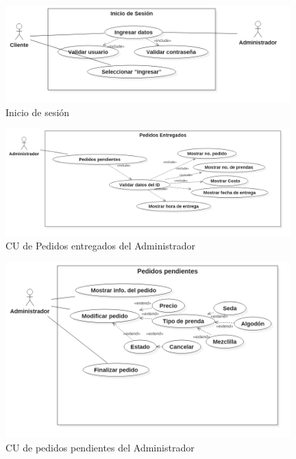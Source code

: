\begin{figure}[htb]
\begin{center}
\includegraphics[width=11cm]{./imagenes/diagramas/CU_IniciarSesion.png}
\end{center}
\caption{Inicio de sesión}
\end{figure}


\begin{figure}[htb]
\begin{center}
\includegraphics[width=11cm]{./imagenes/diagramas/CU_PedidosEntregados(Admin).png}
\end{center}
\caption{CU de Pedidos entregados del Administrador}
\end{figure}


\begin{figure}[htb]
\begin{center}
\includegraphics[width=11cm]{./imagenes/diagramas/CU_PedidosPendientes(Admin).png}
\end{center}
\caption{CU de pedidos pendientes del Administrador}
\end{figure}


